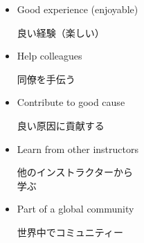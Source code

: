 \documentclass{beamer}
\begin{document}
\begin{frame}
\begin{columns}[T]
\begin{column}[T]{6cm}
\begin{itemize}
  \end{itemize}
  \end{column} \begin{column}[T]{6cm} %
    \begin{itemize}
  \item Good experience (enjoyable) \\ \begin{CJK}{UTF8}{min}良い経験（楽しい）\end{CJK}
      \smallskip
   
   \item Help colleagues \\ \begin{CJK}{UTF8}{min}同僚を手伝う\end{CJK}
      \smallskip
   
   \item Contribute to good cause %
    \\ \begin{CJK}{UTF8}{min}良い原因に貢献する\end{CJK}
      \smallskip
   
   \item Learn from other instructors \\ \begin{CJK}{UTF8}{min}他のインストラクターから\\ 学ぶ\end{CJK}
      \smallskip
   
   \item Part of a global community \\ \begin{CJK}{UTF8}{min}世界中でコミュニティー
\end{CJK}
   
  \end{itemize}
    \end{column}
     \end{columns}  
  
  \end{frame}
\end{document}
